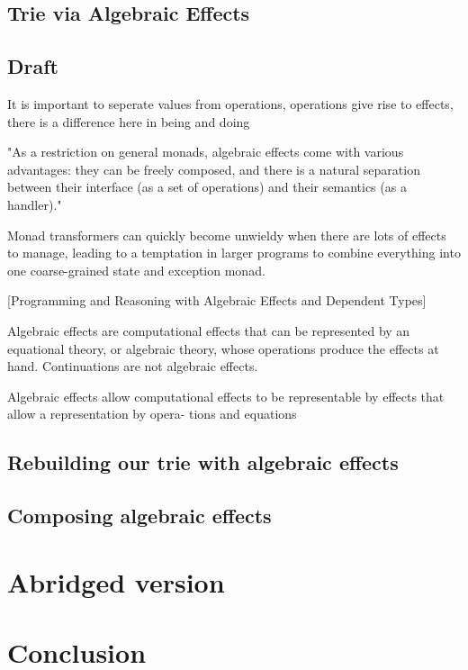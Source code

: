 \documentclass[a4paper,10pt]{article}
\theoremstyle{definition}
\begin{document}
\subsection{Trie via Algebraic Effects}

\subsection{Draft}

It is important to seperate values from operations, operations give rise to effects,
there is a difference here in being and doing

"As a restriction on general monads, algebraic effects come with various advantages:
they can be freely composed, 
and there is a natural separation between their interface (as a set of operations) and their semantics (as a handler)."


Monad transformers can quickly become unwieldy when there are lots of effects to manage, leading to a temptation in larger programs to combine everything into one coarse-grained state and exception monad.

[Programming and Reasoning with Algebraic Effects and Dependent Types]


Algebraic effects are computational effects that can be represented by an equational theory, or algebraic theory, whose operations produce the effects at hand.
Continuations are not algebraic effects.

Algebraic effects allow computational effects to be representable by
effects that allow a representation by opera- tions and equations

\subsection{Rebuilding our trie with algebraic effects}
\subsection{Composing algebraic effects}

\section{Abridged version}

\section{Conclusion}

\medskip



\end{document}
